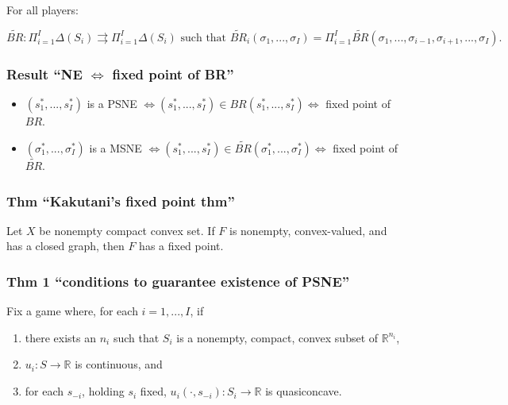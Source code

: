 \documentclass[
]{article}
\providecommand{\tightlist}{%
  \setlength{\itemsep}{0pt}\setlength{\parskip}{0pt}}
\begin{document}
For all players:

\[\tilde{BR}: \Pi_{i=1}^I \Delta(S_i) \rightrightarrows \Pi_{i=1}^I \Delta(S_i) \text{ such that } \tilde{BR}_i(\sigma_1, ..., \sigma_I) = \Pi_{i=1}^I \tilde{BR} (\sigma_1, ..., \sigma_{i-1}, \sigma_{i+1}, ..., \sigma_I).\]

\hypertarget{result-ne-iff-fixed-point-of-br}{%
\subsubsection{\texorpdfstring{Result ``NE \(\iff\) fixed point of
BR''}{Result ``NE \textbackslash iff fixed point of BR''}}\label{result-ne-iff-fixed-point-of-br}}

\begin{itemize}
\tightlist
\item
  \((s_1^*, ..., s_I^*)\) is a PSNE
  \(\iff (s_1^*, ..., s_I^*) \in BR(s_1^*, ..., s_I^*) \iff\) fixed
  point of \(BR\).
\item
  \((\sigma_1^*, ..., \sigma_I^*)\) is a MSNE
  \(\iff (s_1^*, ..., s_I^*) \in \tilde{BR}(\sigma_1^*, ..., \sigma_I^*) \iff\)
  fixed point of \(\tilde{BR}\).
\end{itemize}

\hypertarget{thm-kakutanis-fixed-point-thm}{%
\subsubsection{Thm ``Kakutani's fixed point
thm''}\label{thm-kakutanis-fixed-point-thm}}

Let \(X\) be nonempty compact convex set. If \(F\) is nonempty,
convex-valued, and has a closed graph, then \(F\) has a fixed point.

\hypertarget{thm-1-conditions-to-guarantee-existence-of-psne}{%
\subsubsection{Thm 1 ``conditions to guarantee existence of
PSNE''}\label{thm-1-conditions-to-guarantee-existence-of-psne}}

Fix a game where, for each \(i = 1, ..., I\), if

\begin{enumerate}
\def\labelenumi{\arabic{enumi}.}
\tightlist
\item
  there exists an \(n_i\) such that \(S_i\) is a nonempty, compact,
  convex subset of \(\mathbb{R}^{n_i}\),
\item
  \(u_i: S \rightarrow \mathbb{R}\) is continuous, and
\item
  for each \(s_{-i}\), holding \(s_i\) fixed,
  \(u_i(\cdot, s_{-i}): S_i \rightarrow \mathbb{R}\) is quasiconcave.
\end{enumerate}
\end{document}
